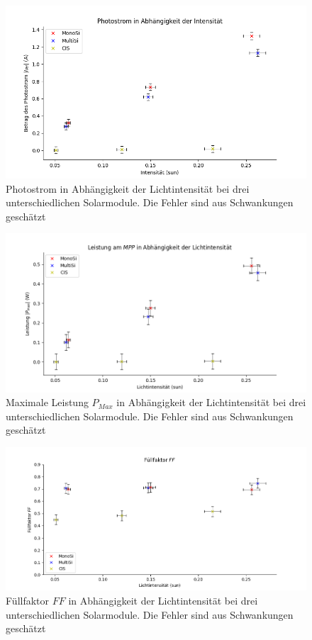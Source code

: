 \begin{figure}[ht]
    \centering
    \includegraphics[width = \linewidth]{Bilder/IPhInt.png}
    \caption{Photostrom in Abhängigkeit der Lichtintensität bei drei unterschiedlichen Solarmodule. Die Fehler 
    sind aus Schwankungen geschätzt}

\end{figure}

\begin{figure}[ht]
    \centering
    \includegraphics[width = \linewidth]{Bilder/MPPInt.png}
    \caption{Maximale Leistung $P_{Max}$ in Abhängigkeit der Lichtintensität bei drei unterschiedlichen Solarmodule. Die Fehler 
    sind aus Schwankungen geschätzt}  
\end{figure}

\begin{figure}[ht]
    \centering
    \includegraphics[width = \linewidth]{Bilder/FFInt.png}
    \caption{Füllfaktor $FF$ in Abhängigkeit der Lichtintensität bei drei unterschiedlichen Solarmodule. Die Fehler 
    sind aus Schwankungen geschätzt}  
\end{figure}


